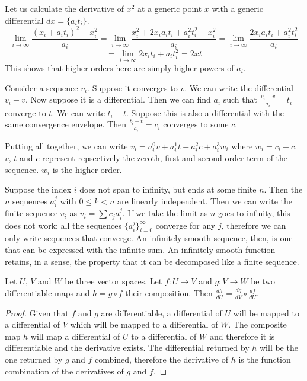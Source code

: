 \documentclass[11pt,letterpaper,fleqn]{memoir}
\begin{document}
\begin{remark}
	Let us calculate the derivative of $x^2$ at a generic point $x$ with a generic differential $dx = \{a_i t_i\}$.
	$$ \lim\limits_{i \to \infty} \frac{(x_i + a_i t_i)^2 - x_i^2}{a_i} = \lim\limits_{i \to \infty} \frac{x_i^2 + 2 x_i a_i t_i + a_i^2t_i^2 - x_i^2}{a_i} = \lim\limits_{i \to \infty} \frac{2 x_i a_i t_i + a_i^2t_i^2}{a_i}$$
	$$= \lim\limits_{i \to \infty} 2 x_i t_i + a_i t_i^2=2xt$$
	This shows that higher orders here are simply higher powers of $a_i$.
\end{remark}

\begin{remark}
	Consider a sequence $v_i$. Suppose it converges to $v$. We can write the differential $v_i - v$. Now suppose it is a differential. Then we can find $a_i$ such that $\frac{v_i - v}{a_i} = t_i$ converge to $t$. We can write $t_i - t$. Suppose this is also a differential with the same convergence envelope. Then $\frac{t_i - t}{a_i} = c_i$ converges to some $c$.
	
	Putting all together, we can write $v_i = a_i^0 v + a_i^1 t + a_i^2 c + a_i^3 w_i$ where $w_i = c_i - c$. $v$, $t$ and $c$ represent repsectively the zeroth, first and second order term of the sequence. $w_i$ is the higher order.
	
	Suppose the index $i$ does not span to infinity, but ends at some finite $n$. Then the $n$ sequences $a_i^j$ with $0 \leq k < n$ are linearly independent. Then we can write the finite sequence $v_i$ as $v_i = \sum c_j a_i^j$. If we take the limit as $n$ goes to infinity, this does not work: all the sequences $\{a_i^j\}_{i=0}^\infty$ converge for any $j$, therefore we can only write sequences that converge. An infinitely smooth sequence, then, is one that can be expressed with the infinite sum. An infinitely smooth function retains, in a sense, the property that it can be decomposed like a finite sequence.
\end{remark}


\begin{prop}
	Let $U$, $V$ and $W$ be three vector spaces. Let $f : U \to V$ and $g : V \to W$ be two differentiable maps and $h = g \circ f$ their composition. Then $\frac{dh}{dU} = \frac{dg}{dV} \circ \frac{df}{dU}$.
\end{prop}

\begin{proof}
	Given that $f$ and $g$ are differentiable, a differential of $U$ will be mapped to a differential of $V$ which will be mapped to a differential of $W$. The composite map $h$ will map a differential of $U$ to a differential of $W$ and therefore it is differentiable and the derivative exists. The differential returned by $h$ will be the one returned by $g$ and $f$ combined, therefore the derivative of $h$ is the function combination of the derivatives of $g$ and $f$.
\end{proof}
\end{document}
